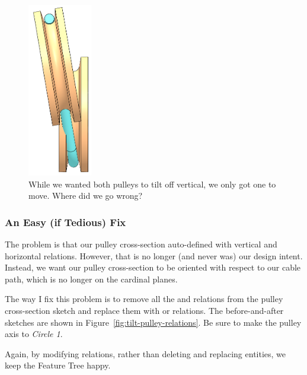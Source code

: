 \begin{figure}[H]
\begin{center}
  \includegraphics[height=3in]{images/figures/pulley-not-tilted.png}
\end{center}
\caption{While we wanted both pulleys to tilt off vertical, we only got one to move.
Where did we go wrong? \label{fig:pulley-not-tilted}}

\end{figure}

\subsubsection{An Easy (if Tedious) Fix}

The problem is that our pulley cross-section auto-defined with vertical and
horizontal relations. However, that is no longer (and never was) our design intent.
Instead, we want our pulley cross-section to be oriented with respect to our
cable path, which is no longer on the cardinal planes.

The way I fix this problem is to remove all the  and
 relations from the pulley cross-section sketch and replace them with
 or  relations. The before-and-after
sketches are shown in Figure~\ref{fig:tilt-pulley-relations}. Be sure to make
the pulley axis  to \emph{Circle 1}.

Again, by modifying
relations, rather than deleting and replacing entities, we keep the Feature Tree
happy.

